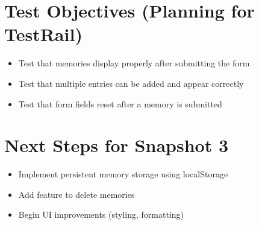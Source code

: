 \documentclass[12pt]{article}
\begin{document}
\section*{Test Objectives (Planning for TestRail)}
\begin{itemize}
  \item Test that memories display properly after submitting the form
  \item Test that multiple entries can be added and appear correctly
  \item Test that form fields reset after a memory is submitted
\end{itemize}

\section*{Next Steps for Snapshot 3}
\begin{itemize}
  \item Implement persistent memory storage using localStorage
  \item Add feature to delete memories
  \item Begin UI improvements (styling, formatting)
\end{itemize}
\end{document}
